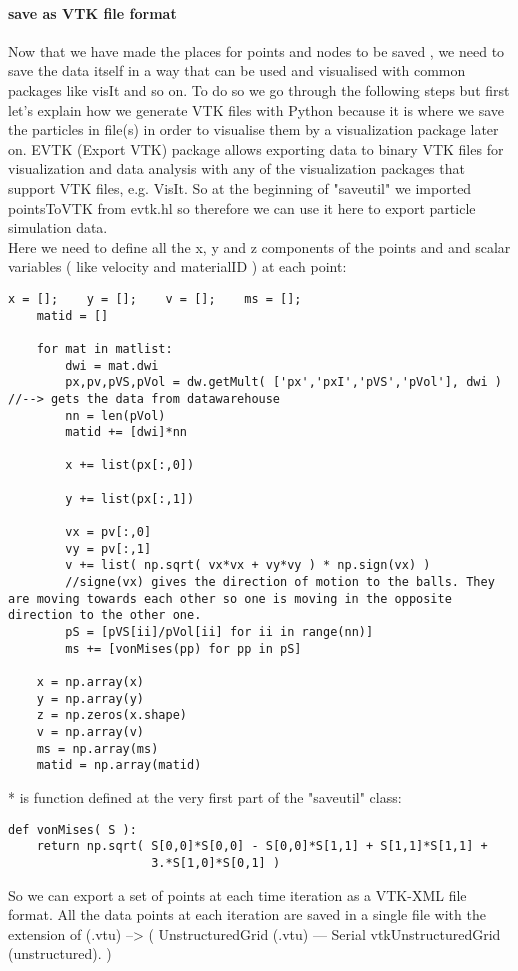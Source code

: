 \documentclass[11pt,fleqn]{book} %
\begin{document}
\paragraph{save as VTK file format}
Now that we have made the places for points and nodes to be saved , we need to save the data itself in a way that can be used and visualised with common packages like visIt and so on. To do so we go through the following steps but first let's explain how we generate VTK files with Python because it is where we save the particles in file(s) in order to visualise them by a visualization package later on.
EVTK (Export VTK) package allows exporting data to binary VTK files for visualization and data analysis with any of the visualization packages that support VTK files, e.g. VisIt. So at the beginning of "saveutil" we imported pointsToVTK from evtk.hl so therefore we can use it here to export particle simulation data.\\
Here we need to define all the x, y and z components of the points and and scalar variables ( like velocity  and materialID ) at each point:
\begin{lstlisting}
x = [];	   y = [];    v = [];    ms = [];
	matid = []
	
	for mat in matlist:
	    dwi = mat.dwi
	    px,pv,pVS,pVol = dw.getMult( ['px','pxI','pVS','pVol'], dwi ) //--> gets the data from datawarehouse
	    nn = len(pVol)
	    matid += [dwi]*nn
	    
	    x += list(px[:,0])
            
	    y += list(px[:,1]) 
	
	    vx = pv[:,0]
	    vy = pv[:,1]
	    v += list( np.sqrt( vx*vx + vy*vy ) * np.sign(vx) )
	    //signe(vx) gives the direction of motion to the balls. They are moving towards each other so one is moving in the opposite direction to the other one.
	    pS = [pVS[ii]/pVol[ii] for ii in range(nn)]
	    ms += [vonMises(pp) for pp in pS]
	    
	x = np.array(x)
	y = np.array(y)
	z = np.zeros(x.shape)
	v = np.array(v)
	ms = np.array(ms)
	matid = np.array(matid)
\end{lstlisting}
* is function defined at the very first part of the "saveutil" class:
\begin{lstlisting}
def vonMises( S ):
    return np.sqrt( S[0,0]*S[0,0] - S[0,0]*S[1,1] + S[1,1]*S[1,1] +
                    3.*S[1,0]*S[0,1] )
\end{lstlisting}
So we can export a set of points at each time iteration as a VTK-XML file format. All the data points at each iteration are saved in a single file with the extension of (.vtu) --> ( UnstructuredGrid (.vtu) — Serial vtkUnstructuredGrid (unstructured). )
\end{document}
